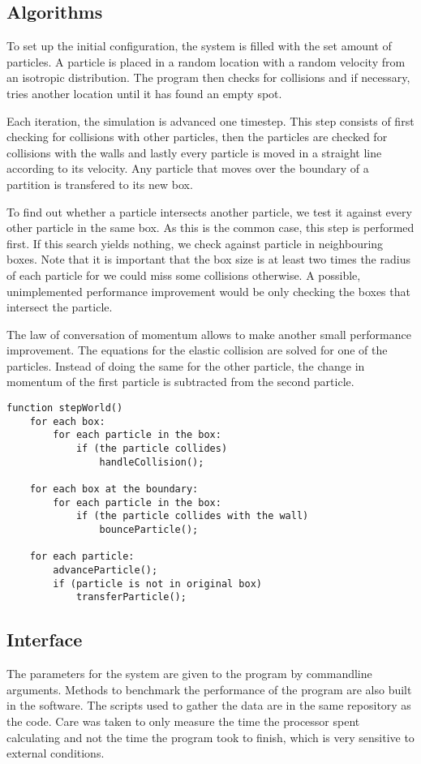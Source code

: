 \subsection{Algorithms}

To set up the initial configuration, the system is filled with the set amount 
of particles. A particle is placed in a random location with a random velocity 
from an isotropic distribution. The program then checks for collisions and if 
necessary, tries another location until it has found an empty spot.

Each iteration, the simulation is advanced one timestep. This step consists of 
first checking for collisions with other particles, then the particles are 
checked for collisions with the walls and lastly every particle is moved in a 
straight line according to its velocity. Any particle that moves over the 
boundary of a partition is transfered to its new box.

To find out whether a particle intersects another particle, we test it against 
every other particle in the same box. As this is the common case, this step is 
performed first. If this search yields nothing, we check against particle in 
neighbouring boxes. Note that it is important that the box size is at least two 
times the radius of each particle for we could miss some collisions otherwise. 
A possible, unimplemented performance improvement would be only checking the 
boxes that intersect the particle. 

The law of conversation of momentum allows to make another small performance 
improvement. The equations for the elastic collision are solved for one of the 
particles. Instead of doing the same for the other particle, the change in 
momentum of the first particle is subtracted from the second particle.

\begin{lstlisting}
function stepWorld()
	for each box:
		for each particle in the box:
			if (the particle collides)
				handleCollision();
	
	for each box at the boundary:
		for each particle in the box:
			if (the particle collides with the wall)
				bounceParticle();
	
	for each particle:
		advanceParticle();
		if (particle is not in original box)
			transferParticle();
\end{lstlisting}

\subsection{Interface}
The parameters for the system are given to the program by commandline 
arguments. Methods to benchmark the performance of the program are also built 
in the software. The scripts used to gather the data are in the same repository 
as the code. Care was taken to only measure the time the processor spent 
calculating and not the time the program took to finish, which is very 
sensitive to external conditions.

